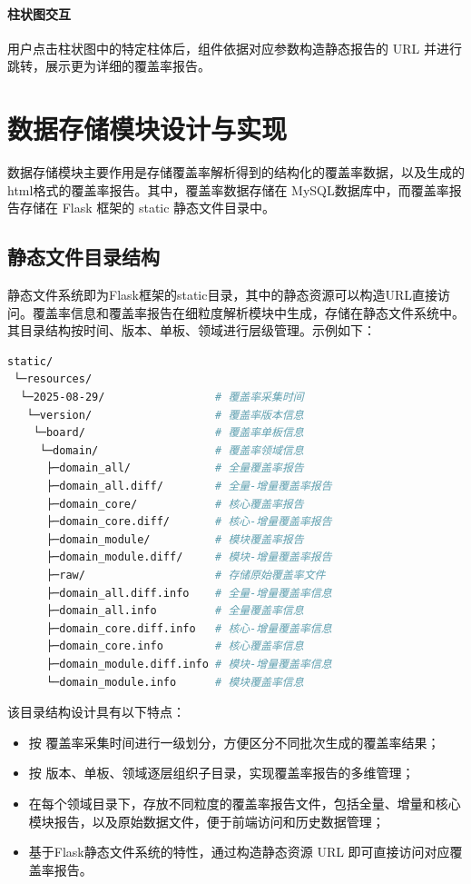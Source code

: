 \paragraph{柱状图交互}
用户点击柱状图中的特定柱体后，组件依据对应参数构造静态报告的 URL 并进行跳转，展示更为详细的覆盖率报告。

\section{数据存储模块设计与实现}
数据存储模块主要作用是存储覆盖率解析得到的结构化的覆盖率数据，以及生成的html格式的覆盖率报告。其中，覆盖率数据存储在 MySQL数据库中，而覆盖率报告存储在 Flask 框架的 static 静态文件目录中。

\subsection{静态文件目录结构}
静态文件系统即为Flask框架的static目录，其中的静态资源可以构造URL直接访问。覆盖率信息和覆盖率报告在细粒度解析模块中生成，存储在静态文件系统中。其目录结构按时间、版本、单板、领域进行层级管理。示例如下：

\begin{lstlisting}[language=bash, basicstyle=\ttfamily\small, breaklines=true, breakindent=2em, frame=tb]
static/
 └─resources/
  └─2025-08-29/                 # 覆盖率采集时间
   └─version/                   # 覆盖率版本信息
    └─board/                    # 覆盖率单板信息
     └─domain/                  # 覆盖率领域信息
      ├─domain_all/             # 全量覆盖率报告
      ├─domain_all.diff/        # 全量-增量覆盖率报告
      ├─domain_core/            # 核心覆盖率报告
      ├─domain_core.diff/       # 核心-增量覆盖率报告
      ├─domain_module/          # 模块覆盖率报告
      ├─domain_module.diff/     # 模块-增量覆盖率报告
      ├─raw/                    # 存储原始覆盖率文件
      ├─domain_all.diff.info    # 全量-增量覆盖率信息
      ├─domain_all.info         # 全量覆盖率信息
      ├─domain_core.diff.info   # 核心-增量覆盖率信息
      ├─domain_core.info        # 核心覆盖率信息
      ├─domain_module.diff.info # 模块-增量覆盖率信息
      └─domain_module.info      # 模块覆盖率信息
\end{lstlisting}


\noindent 该目录结构设计具有以下特点：
\begin{itemize}
    \item 按 覆盖率采集时间进行一级划分，方便区分不同批次生成的覆盖率结果；
    \item 按 版本、单板、领域逐层组织子目录，实现覆盖率报告的多维管理；
    \item 在每个领域目录下，存放不同粒度的覆盖率报告文件，包括全量、增量和核心模块报告，以及原始数据文件，便于前端访问和历史数据管理；
    \item 基于Flask静态文件系统的特性，通过构造静态资源 URL 即可直接访问对应覆盖率报告。
\end{itemize}

